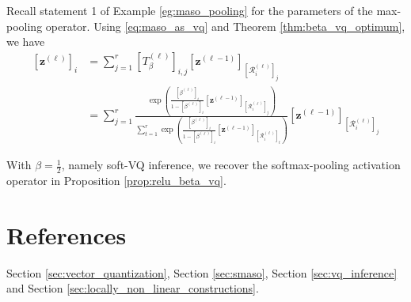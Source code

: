 \begin{tproof}
    Recall statement 1 of Example \ref{eg:maso_pooling} for the parameters of the max-pooling operator. Using \eqref{eq:maso_as_vq} and Theorem \ref{thm:beta_vq_optimum}, we have
    \begin{align*}
        \left[\mathbf{z}^{(\ell)}\right]_i&=\sum_{j=1}^r\left[T^{(\ell)}_{\beta}\right]_{i,j}\left[\mathbf{z}^{(\ell-1)}\right]_{\left[\mathcal{R}_i^{(\ell)}\right]_j}\\&=\sum_{j=1}^r\frac{\exp\left(\frac{\left[\beta^{(\ell)}\right]_i}{1-\left[\beta^{(\ell)}\right]_i}\left[\mathbf{z}^{(\ell-1)}\right]_{\left[\mathcal{R}^{(\ell)}_i\right]_j}\right)}{\sum_{t=1}^r\exp\left(\frac{\left[\beta^{(\ell)}\right]_i}{1-\left[\beta^{(\ell)}\right]_i}\left[\mathbf{z}^{(\ell-1)}\right]_{\left[\mathcal{R}^{(\ell)}_i\right]_t}\right)}\left[\mathbf{z}^{(\ell-1)}\right]_{\left[\mathcal{R}_i^{(\ell)}\right]_j}
    \end{align*}
\end{tproof}

\begin{remark}
    With $\beta=\frac{1}{2}$, namely soft-VQ inference, we recover the softmax-pooling activation operator in Proposition \ref{prop:relu_beta_vq}.
\end{remark}

\section{References}

Section \ref{sec:vector_quantization}, Section \ref{sec:smaso}, Section \ref{sec:vq_inference} and Section \ref{sec:locally_non_linear_constructions}.